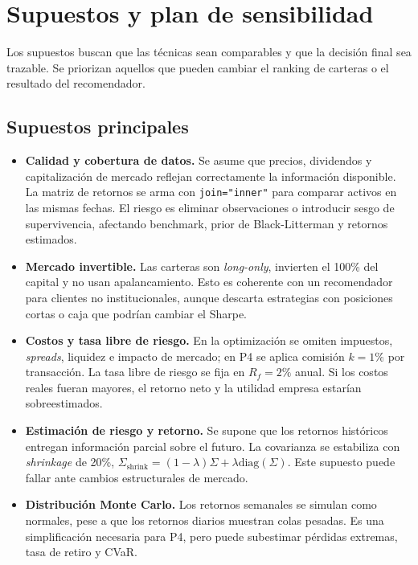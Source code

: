 \section{Supuestos y plan de sensibilidad}

Los supuestos buscan que las t\'ecnicas sean comparables y que la decisi\'on
final sea trazable. Se priorizan aquellos que pueden cambiar el ranking de
carteras o el resultado del recomendador.

\subsection{Supuestos principales}

\begin{itemize}
    \item \textbf{Calidad y cobertura de datos.} Se asume que precios,
    dividendos y capitalizaci\'on de mercado reflejan correctamente la
    informaci\'on disponible. La matriz de retornos se arma con
    \texttt{join="inner"} para comparar activos en las mismas fechas. El riesgo
    es eliminar observaciones o introducir sesgo de supervivencia, afectando
    benchmark, prior de Black-Litterman y retornos estimados.

    \item \textbf{Mercado invertible.} Las carteras son \textit{long-only},
    invierten el 100\% del capital y no usan apalancamiento. Esto es coherente
    con un recomendador para clientes no institucionales, aunque descarta
    estrategias con posiciones cortas o caja que podr\'ian cambiar el Sharpe.

    \item \textbf{Costos y tasa libre de riesgo.} En la optimizaci\'on se omiten
    impuestos, \textit{spreads}, liquidez e impacto de mercado; en P4 se aplica
    comisi\'on $k=1\%$ por transacci\'on. La tasa libre de riesgo se fija en
    $R_f=2\%$ anual. Si los costos reales fueran mayores, el retorno neto y la
    utilidad empresa estar\'ian sobreestimados.

    \item \textbf{Estimaci\'on de riesgo y retorno.} Se supone que los retornos
    hist\'oricos entregan informaci\'on parcial sobre el futuro. La covarianza
    se estabiliza con \textit{shrinkage} de 20\%,
    $\Sigma_{\text{shrink}}=(1-\lambda)\Sigma+\lambda\text{diag}(\Sigma)$.
    Este supuesto puede fallar ante cambios estructurales de mercado.

    \item \textbf{Distribuci\'on Monte Carlo.} Los retornos semanales se simulan
    como normales, pese a que los retornos diarios muestran colas pesadas. Es
    una simplificaci\'on necesaria para P4, pero puede subestimar p\'erdidas
    extremas, tasa de retiro y CVaR.


\end{itemize}
